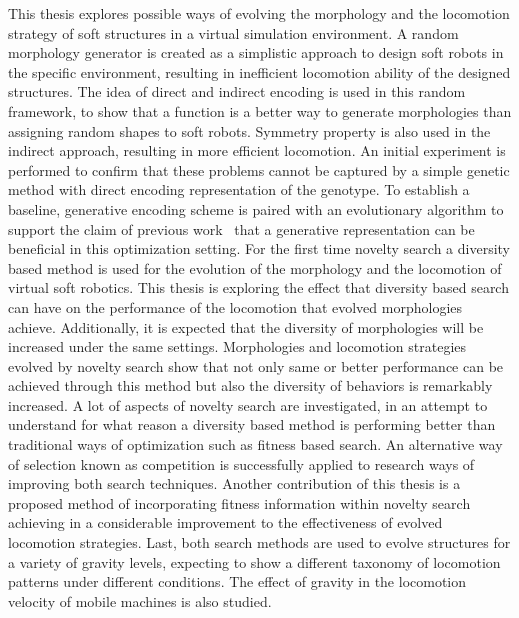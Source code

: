 This thesis explores possible ways of evolving the morphology and the locomotion strategy of soft structures in a virtual simulation environment. A random morphology generator is created as a simplistic approach to design soft robots in the specific environment, resulting in inefficient locomotion ability of the designed structures. The idea of direct and indirect encoding is used in this random framework, to show that a function is a better way to generate morphologies than assigning random shapes to soft robots. Symmetry property is also used in the indirect approach, resulting in more efficient locomotion. An initial experiment is performed to confirm that these problems cannot be captured by a simple genetic method with direct encoding representation of the genotype. To establish a baseline, generative encoding scheme is paired with an evolutionary algorithm to support the claim of previous work~\citep{cheney2013unshackling} that a generative representation can be beneficial in this optimization setting. For the first time novelty search a diversity based method is used for the evolution of the morphology and the locomotion of virtual soft robotics. This thesis is exploring the effect that diversity based search can have on the performance of the locomotion that evolved morphologies achieve. Additionally, it is expected that the diversity of morphologies will be increased under the same settings. Morphologies and locomotion strategies evolved by novelty search show that not only same or better performance can be achieved through this method but also the diversity of behaviors is remarkably increased. A lot of aspects of novelty search are investigated, in an attempt to understand for what reason a diversity based method is performing better than traditional ways of optimization such as fitness based search. An alternative way of selection known as competition is successfully applied to research ways of improving both search techniques. Another contribution of this thesis is a proposed method of incorporating fitness information within novelty search achieving in a considerable improvement to the effectiveness of evolved locomotion strategies. Last, both search methods are used to evolve structures for a variety of gravity levels, expecting to show a different taxonomy of locomotion patterns under different conditions. The effect of gravity in the locomotion velocity of mobile machines is also studied.


